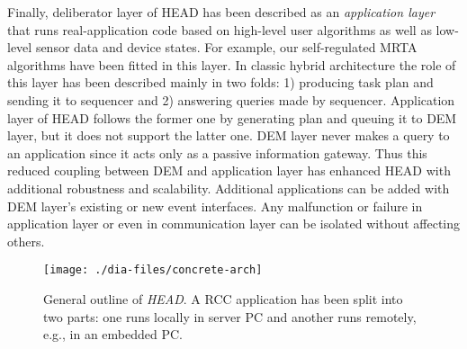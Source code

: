 Finally, deliberator layer of HEAD has been described as an {\em application layer} that runs real-application code based on high-level user algorithms as well as low-level sensor data and device states. For example, our self-regulated MRTA algorithms have been fitted in this layer. In classic hybrid architecture the role of this layer has been described mainly in two folds: 1) producing task plan and sending it to sequencer and 2) answering queries made by sequencer. Application layer of HEAD follows the former one by generating plan and queuing it to DEM layer, but it does not support the latter one. DEM layer never makes a query to an application since it acts only as a passive information gateway. Thus this reduced coupling between DEM and application layer has enhanced HEAD with additional robustness and scalability. Additional applications can be added with DEM layer's existing or new event interfaces. Any malfunction or failure in application layer or even in communication layer can be isolated without affecting others. 
\begin{figure*}
\begin{center}
\texttt{[image: ./dia-files/concrete-arch]} 
\caption{General outline of {\em HEAD}. A RCC application has been split into two parts: one runs locally in server PC and another runs remotely, e.g., in an embedded PC.} 
\label{fig:concrete-arch}
\end{center}
\end{figure*}
